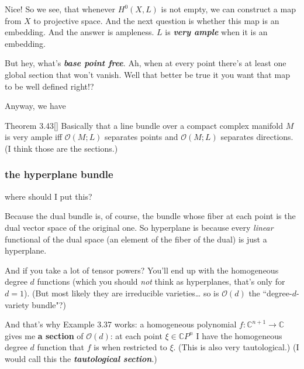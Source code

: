 Nice! So we see, that whenever \(H^{0}(X,L)\) is not empty, we can construct a map from \(X\) to projective space. And the next question is whether this map is an embedding. And the answer is ampleness. \(L\) is \textit{\textbf{very  ample}} when it is an embedding.

But hey, what's \textit{\textbf{base point free}}. Ah, when at every point there's at least one global section that won't vanish. Well that better be true it you want that map to be well defined right!?

Anyway, we have
\begin{thing4}{Theorem 3.43}[\cite{lec}]\label{thm:3.43}\leavevmode
Basically that a line bundle over a compact complex manifold \(M\) is very ample iff \(\mathcal{O}(M;L)\) separates points and \(\mathcal{O}(M;L)\) separates directions. (I think those are the sections.)
\end{thing4}

\subsubsection*{the hyperplane bundle}
where should I put this?
\begin{upshot}\leavevmode
Because the dual bundle is, of course, the bundle whose fiber at each point is the dual vector space of the original one. So hyperplane is because every \textit{linear}  functional of the dual space (an element of the fiber of the dual) is just a hyperplane.

And if you take a lot of tensor powers? You'll end up with the homogeneous degree \(d\) functions (which you should \textit{not} think as hyperplanes, that's only for \(d=1\)). (But most likely they are irreducible varieties… so is \(\mathcal{O}(d)\) the ``degree-\(d\)-variety bundle"?)
\end{upshot}

And that's why \cite{lec} Example 3.37 works: a homogeneous polynomial \(f: \mathbb{C}^{n+1}\to \mathbb{C}\) gives me \textbf{a section} of \(\mathcal{O}(d)\): at each point \(\xi \in \mathbb{C}P^{n}\) I have the homogeneous degree \(d\) function that \(f\) is when restricted to \(\xi\). (This is also very tautological.) (I would call this the \textit{\textbf{tautological section}}.)


